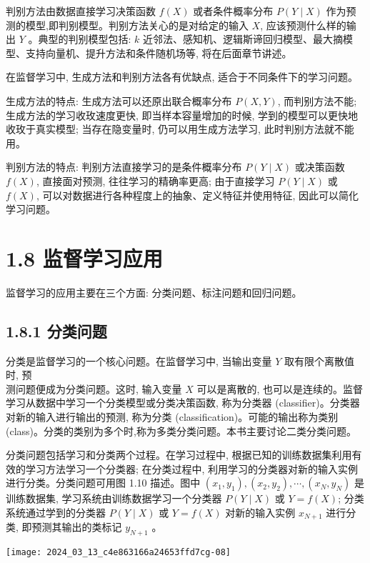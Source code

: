 \documentclass[10pt]{article}
\begin{document}
判别方法由数据直接学习决策函数 $f(X)$ 或者条件概率分布 $P(Y \mid X)$ 作为预测的模型,即判别模型。判别方法关心的是对给定的输入 $X$, 应该预测什么样的输出 $Y$ 。典型的判别模型包括: $k$ 近邻法、感知机、逻辑斯谛回归模型、最大摘模型、支持向量机、提升方法和条件随机场等, 将在后面章节讲述。

在监督学习中, 生成方法和判别方法各有优缺点, 适合于不同条件下的学习问题。

生成方法的特点: 生成方法可以还原出联合概率分布 $P(X, Y)$, 而判别方法不能; 生成方法的学习收玫速度更快, 即当样本容量增加的时候, 学到的模型可以更快地收玫于真实模型; 当存在隐变量时, 仍可以用生成方法学习, 此时判别方法就不能用。

判别方法的特点: 判别方法直接学习的是条件概率分布 $P(Y \mid X)$ 或决策函数 $f(X)$, 直接面对预测, 往往学习的精确率更高; 由于直接学习 $P(Y \mid X)$ 或 $f(X)$, 可以对数据进行各种程度上的抽象、定义特征并使用特征, 因此可以简化学习问题。

\section*{1.8 监督学习应用}
监督学习的应用主要在三个方面: 分类问题、标注问题和回归问题。

\subsection*{1.8.1 分类问题}
分类是监督学习的一个核心问题。在监督学习中, 当输出变量 $Y$ 取有限个离散值时, 预\\
测问题便成为分类问题。这时, 输入变量 $X$ 可以是离散的, 也可以是连续的。监督学习从数据中学习一个分类模型或分类决策函数, 称为分类器 (classifier)。分类器对新的输入进行输出的预测, 称为分类 (classification)。可能的输出称为类别 (class)。分类的类别为多个时,称为多类分类问题。本书主要讨论二类分类问题。

分类问题包括学习和分类两个过程。在学习过程中, 根据已知的训练数据集利用有效的学习方法学习一个分类器; 在分类过程中, 利用学习的分类器对新的输入实例进行分类。分类问题可用图 1.10 描述。图中 $\left(x_{1}, y_{1}\right),\left(x_{2}, y_{2}\right), \cdots,\left(x_{N}, y_{N}\right)$ 是训练数据集, 学习系统由训练数据学习一个分类器 $P(Y \mid X)$ 或 $Y=f(X)$; 分类系统通过学到的分类器 $P(Y \mid X)$ 或 $Y=f(X)$ 对新的输入实例 $x_{N+1}$ 进行分类, 即预测其输出的类标记 $y_{N+1}$ 。

\begin{center}
\texttt{[image: 2024\_03\_13\_c4e863166a24653ffd7cg-08]}
\end{center}
\end{document}
